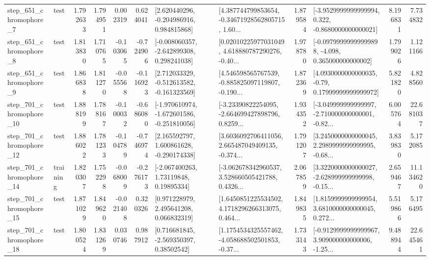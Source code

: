 \begin{tabular}{llrrrrllrlrr}
   step\_651\_chromophore\_7 &      test &      1.792633 &    1.794951 &      0.002319 &  0.624041 &    [2.620440296, -0.204986916, 0.984815868] &  [4.387744799853654, -0.34671928562805715, 1.60... &       1.879584 &  [-3.9529999999999994, 0.322, -0.8680000000000021] &            8.196831 &          7.734832 \\
   step\_651\_chromophore\_8 &      test &      1.813830 &    1.710765 &     -0.103065 & -0.724906 &   [-0.008060357, -2.642899308, 0.298241038] &  [0.02010225977031049, 4.618880787290276, -0.40... &       1.978780 &  [-0.09799999999999898, -4.098, 0.365000000000002] &            1.799026 &          1.121166 \\
   step\_651\_chromophore\_9 &      test &      1.866838 &    1.811270 &     -0.055568 & -0.116923 &   [2.712033329, -0.512613582, -0.161323569] &  [4.546598565767539, -0.885825097119807, -0.190... &       1.872369 &   [4.0930000000000035, -0.79, 0.17999999999999972] &            5.821820 &          4.828560 \\
  step\_701\_chromophore\_10 &      test &      1.888199 &    1.788167 &     -0.100032 & -0.686080 &  [-1.970610974, -1.672601586, -0.251810056] &  [-3.23390822254095, -2.664699427898796, 0.8259... &       1.934352 &  [-3.049999999999997, -2.710000000000001, -0.82... &            6.005764 &         22.681037 \\
  step\_701\_chromophore\_12 &      test &      1.886022 &    1.781233 &     -0.104789 & -0.746974 &    [2.165592797, 1.600861628, -0.290174338] &  [3.6036092706411056, 2.665487049409135, -0.374... &       1.791207 &  [3.2450000000000045, 2.2989999999999995, -0.68... &            3.839830 &          5.172085 \\
  step\_701\_chromophore\_14 &  training &      1.820307 &    1.752298 &     -0.068009 & -0.276173 &      [-2.067400263, 1.73119848, 0.19895334] &  [-3.062678342960537, 3.528660505421788, 0.4326... &       2.067859 &  [3.3220000000000027, -2.628999999999998, -0.15... &            2.659467 &         11.134620 \\
  step\_701\_chromophore\_15 &      test &      1.871029 &    1.849620 &     -0.021408 &  0.320326 &     [0.971228979, 2.495641208, 0.066832319] &  [1.6450851225534502, 4.1718296266313075, 0.464... &       1.849835 &  [1.8159999999999954, 3.6810000000000045, 0.272... &            5.519866 &          5.176495 \\
  step\_701\_chromophore\_18 &      test &      1.800524 &    1.831269 &      0.030746 &  0.987912 &     [0.716681845, -2.569350397, 0.38502542] &  [1.1754534325557462, -4.058688502501853, -0.37... &       1.733143 &  [-0.9129999999999967, 3.909000000000006, -1.25... &            9.488944 &         22.645461 \\

\end{tabular}
